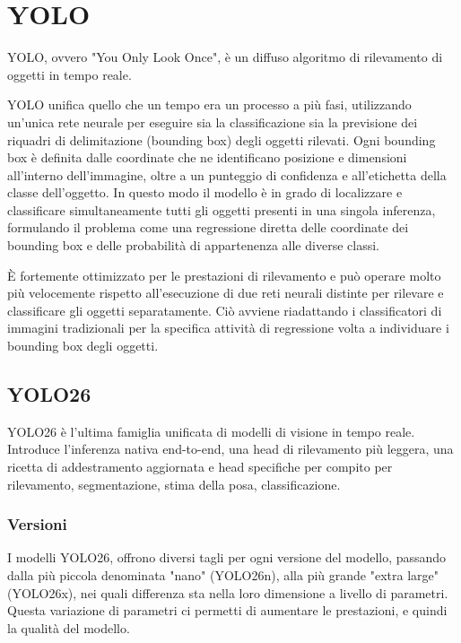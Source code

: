 \chapter{YOLO}

YOLO, ovvero "You Only Look Once", è un diffuso algoritmo di rilevamento di oggetti in tempo reale.

YOLO unifica quello che un tempo era un processo a più fasi, utilizzando un'unica rete neurale per eseguire sia la classificazione sia la previsione dei riquadri di delimitazione (bounding box) degli oggetti rilevati.
Ogni bounding box è definita dalle coordinate che ne identificano posizione e dimensioni all'interno dell'immagine, oltre a un punteggio di confidenza e all'etichetta della classe dell'oggetto. In questo modo il modello è in grado di localizzare e classificare simultaneamente tutti gli oggetti presenti in una singola inferenza, formulando il problema come una regressione diretta delle coordinate dei bounding box e delle probabilità di appartenenza alle diverse classi.

È fortemente ottimizzato per le prestazioni di rilevamento e può operare molto più velocemente rispetto all'esecuzione di due reti neurali distinte per rilevare e classificare gli oggetti separatamente. Ciò avviene riadattando i classificatori di immagini tradizionali per la specifica attività di regressione volta a individuare i bounding box degli oggetti. \cite{yolo_info}

\newpage

\section{YOLO26}

YOLO26 è l'ultima famiglia unificata di modelli di visione in tempo reale.
Introduce l'inferenza nativa end-to-end, una head di rilevamento più leggera, una ricetta di addestramento aggiornata e head specifiche per compito per rilevamento, segmentazione, stima della posa, classificazione. \cite{yolo26_ultralytics}

\subsection{Versioni}

I modelli YOLO26, offrono diversi tagli per ogni versione del modello, passando dalla più piccola denominata "nano" (YOLO26n), alla più grande "extra large" (YOLO26x), nei quali differenza sta nella loro dimensione a livello di parametri.
Questa variazione di parametri ci permetti di aumentare le prestazioni, e quindi la qualità del modello.

